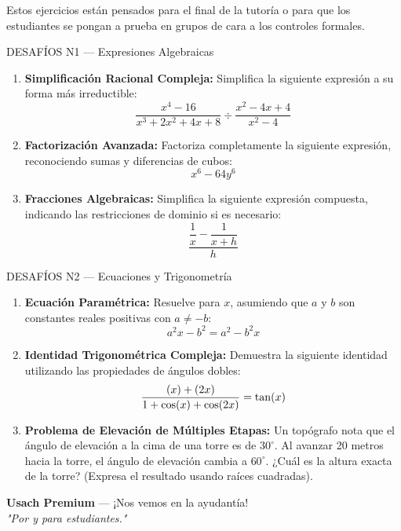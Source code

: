 \documentclass[letterpaper, 12pt]{article}
\let\sin\relax
\DeclareMathOperator{\sin}{sen}
\begin{document}
Estos ejercicios están pensados para el final de la tutoría o para que los
estudiantes se pongan a prueba en grupos de cara a los controles formales.

\vspace{0.5cm}

\begin{desafiobox}{DESAFÍOS N1 — Expresiones Algebraicas}
\begin{enumerate}[label=\textbf{\arabic*.}, leftmargin=*, itemsep=0.5cm, start=41]
    \item \textbf{Simplificación Racional Compleja:} Simplifica la siguiente expresión a su forma más irreductible:
    \[
        \frac{x^4 - 16}{x^3 + 2x^2 + 4x + 8} \div \frac{x^2 - 4x + 4}{x^2 - 4}
    \]
    \item \textbf{Factorización Avanzada:} Factoriza completamente la siguiente expresión, reconociendo sumas y diferencias de cubos:
    \[
        x^6 - 64y^6
    \]
    \item \textbf{Fracciones Algebraicas:} Simplifica la siguiente expresión compuesta, indicando las restricciones de dominio si es necesario:
    \[
        \frac{\dfrac{1}{x} - \dfrac{1}{x+h}}{h}
    \]
\end{enumerate}
\end{desafiobox}

\vspace{0.7cm}

\begin{desafiobox}{DESAFÍOS N2 — Ecuaciones y Trigonometría}
\begin{enumerate}[label=\textbf{\arabic*.}, leftmargin=*, itemsep=0.5cm, start=44]
    \item \textbf{Ecuación Paramétrica:} Resuelve para $x$, asumiendo que $a$ y $b$ son constantes reales positivas con $a \neq -b$:
    \[
        a^2 x - b^2 = a^2 - b^2 x
    \]
    \item \textbf{Identidad Trigonométrica Compleja:} Demuestra la siguiente identidad utilizando las propiedades de ángulos dobles:
    \[
        \frac{\sin(x) + \sin(2x)}{1 + \cos(x) + \cos(2x)} = \tan(x)
    \]
    \item \textbf{Problema de Elevación de Múltiples Etapas:} Un topógrafo nota que el ángulo de elevación a la cima de una torre es de $30^\circ$. Al avanzar 20 metros hacia la torre, el ángulo de elevación cambia a $60^\circ$. ¿Cuál es la altura exacta de la torre? (Expresa el resultado usando raíces cuadradas).
\end{enumerate}
\end{desafiobox}

\vspace{0.8cm}
\begin{center}
    \small\textbf{Usach Premium} — ¡Nos vemos en la ayudantía! \\
    \textit{"Por y para estudiantes."}
\end{center}
\end{document}
